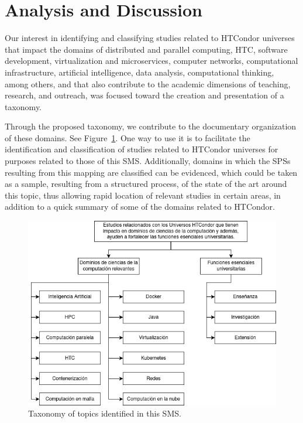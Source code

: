 \section{Analysis and Discussion}\label{sec:analisis-discusion}

Our interest in identifying and classifying studies related to HTCondor universes that impact the domains of distributed and parallel computing, HTC, software development, virtualization and microservices, computer networks, computational infrastructure, artificial intelligence, data analysis, computational thinking, among others, and that also contribute to the academic dimensions of teaching, research, and outreach, was focused toward the creation and presentation of a taxonomy.

Through the proposed taxonomy, we contribute to the documentary organization of these domains. See Figure~\ref{fig:taxonomia}. One way to use it is to facilitate the identification and classification of studies related to HTCondor universes for purposes related to those of this SMS. Additionally, domains in which the SPSs resulting from this mapping are classified can be evidenced, which could be taken as a sample, resulting from a structured process, of the state of the art around this topic, thus allowing rapid location of relevant studies in certain areas, in addition to a quick summary of some of the domains related to HTCondor.

\begin{figure}[htbp]
    \centering
    \vspace{10pt}
    \includegraphics[scale=0.4]{resources/figures/sms-taxonomia.drawio.png}
    \vspace{6pt}
    \caption{Taxonomy of topics identified in this SMS.}
    \label{fig:taxonomia}
\end{figure}